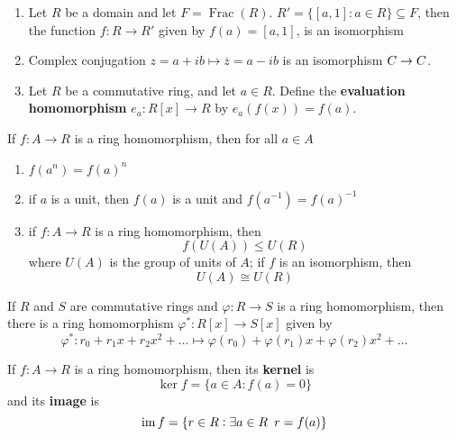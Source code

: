 \documentclass[11pt]{article}
\DeclareMathOperator{\Frac}{Frac}
\begin{document}
\begin{examplle}[]
\begin{enumerate}
\item Let \(R\) be a domain and let \(F=\Frac(R)\). 
\(R'=\{[a,1]:a\in R\}\subseteq F\), then the function \(f:R\to R'\) given
by \(f(a)=[a,1]\), is an isomorphism
\item Complex conjugation \(z=a+ib\mapsto\overline{z}=a-ib\) is an isomorphism
\(\relax{C}\to \relax{C}\).
\item Let \(R\) be a commutative ring, and let \(a\in R\). Define the \textbf{evaluation
homomorphism} \(e_a:R[x]\to R\) by \(e_a(f(x))=f(a)\).
\end{enumerate}
\end{examplle}

\begin{lemma}[]
If \(f:A\to R\) is a ring homomorphism, then for all \(a\in A\)
\begin{enumerate}
\item \(f(a^n)=f(a)^n\)
\item if \(a\) is a unit, then \(f(a)\) is a unit and \(f(a^{-1})=f(a)^{-1}\)
\item if \(f:A\to R\) is a ring homomorphism, then
\begin{equation*}
f(U(A))\le U(R)
\end{equation*}
where \(U(A)\) is the group of units of \(A\); if \(f\) is an isomorphism,
then
\begin{equation*}
U(A)\cong U(R)
\end{equation*}
\end{enumerate}
\end{lemma}

\begin{proposition}[]
\label{prop3.48}
If \(R\) and \(S\) are commutative rings and \(\varphi:R\to S\) is a ring
homomorphism, then there is a ring homomorphism \(\varphi^*:R[x]\to S[x]\)
given by
\begin{equation*}
\varphi^*:r_0+r_1x+r_2x^2+\dots\mapsto\varphi(r_0)+\varphi(r_1)x+
\varphi(r_2)x^2+\dots
\end{equation*}
\end{proposition}

\begin{definition}[]
If \(f:A\to R\) is a ring homomorphism, then its \textbf{kernel} is
\begin{equation*}
\ker f=\{a\in A:f(a)=0\}
\end{equation*}
and its \textbf{image} is 
\begin{equation*}
\operatorname{im} f=\{r\in R:\exists a\in R\enspace r=f(a)\}
\end{equation*}
\end{definition}
\end{document}
